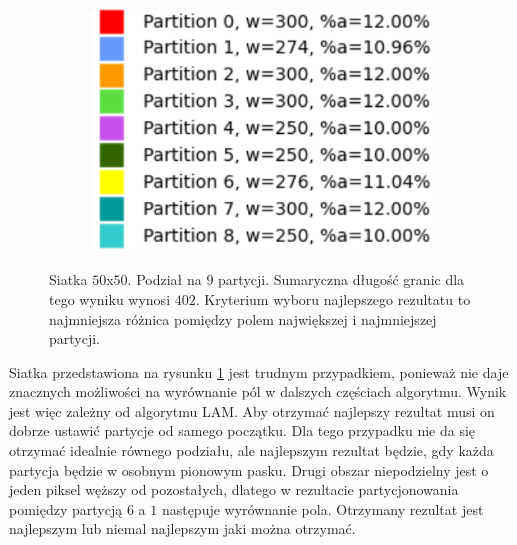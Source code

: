 \begin{figure}[h]
\begin{subfigure}{.33\textwidth}
    \centering
    \includegraphics[width=0.9\linewidth]{images/results/m_k/with/2/results}
    \caption[short]{}
\end{subfigure}
\caption{Siatka $50$x$50$. Podział na $9$ partycji. Sumaryczna długość granic dla tego wyniku wynosi $402$.
Kryterium wyboru najlepszego rezultatu to najmniejsza różnica pomiędzy polem największej i najmniejszej partycji.}
\label{result:2}
\end{figure}

Siatka przedstawiona na rysunku \ref{result:2} jest trudnym przypadkiem, ponieważ nie daje znacznych możliwości na wyrównanie pól
w dalszych częściach algorytmu.
Wynik jest więc zależny od algorytmu LAM.
Aby otrzymać najlepszy rezultat musi on dobrze ustawić partycje od samego początku.
Dla tego przypadku nie da się otrzymać idealnie równego podziału, ale najlepszym rezultat będzie, gdy każda partycja będzie
w osobnym pionowym pasku.
Drugi obszar niepodzielny jest o jeden piksel węższy od pozostałych, dlatego w rezultacie partycjonowania pomiędzy partycją
$6$ a $1$ następuje wyrównanie pola.
Otrzymany rezultat jest najlepszym lub niemal najlepszym jaki można otrzymać.

